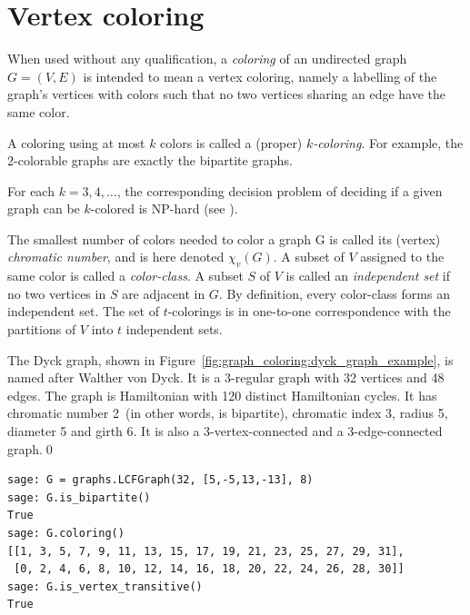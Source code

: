 \section{Vertex coloring}

When used without any qualification, a {\it coloring} of an
undirected graph $G=(V,E)$ is intended
to mean a vertex coloring, namely a labelling of the graph's
vertices with colors such that no two vertices sharing an
edge have the same color.

A coloring using at most $k$ colors is called a (proper) {\it $k$-coloring}.
For example, the $2$-colorable graphs are exactly the bipartite graphs.

\begin{remark}
For each $k=3,4,\dots$, the corresponding decision problem of deciding
if a given graph can be $k$-colored is NP-hard
(see \cite{JaegerEtAl1990}).
\end{remark}

The smallest number of colors needed to color a graph G is called
its (vertex) {\it chromatic number}, and is here denoted $\chi_v(G)$.
A subset of $V$ assigned to the same color is called a {\it color-class}.
A subset $S$ of $V$ is called an {\it independent set} if no two vertices
in $S$ are adjacent in $G$. By definition, every color-class forms
an independent set. The set of $t$-colorings is in one-to-one
correspondence with the partitions of $V$ into $t$ independent sets.

\begin{example}
\label{example:graph_coloring:dyck_graph_example}
\rm
The Dyck graph, shown in
Figure~\ref{fig:graph_coloring:dyck_graph_example}, is named after
Walther von Dyck.  It is a 3-regular graph with 32 vertices and 48
edges.  The graph is Hamiltonian with 120 distinct Hamiltonian cycles.
It has chromatic number 2~(in other words, is bipartite), chromatic
index 3, radius 5, diameter 5 and girth 6.  It is also a
3-vertex-connected and a 3-edge-connected graph.\qed
\end{example}

\begin{lstlisting}
sage: G = graphs.LCFGraph(32, [5,-5,13,-13], 8)
sage: G.is_bipartite()
True
sage: G.coloring()
[[1, 3, 5, 7, 9, 11, 13, 15, 17, 19, 21, 23, 25, 27, 29, 31],
 [0, 2, 4, 6, 8, 10, 12, 14, 16, 18, 20, 22, 24, 26, 28, 30]]
sage: G.is_vertex_transitive()
True
\end{lstlisting}


